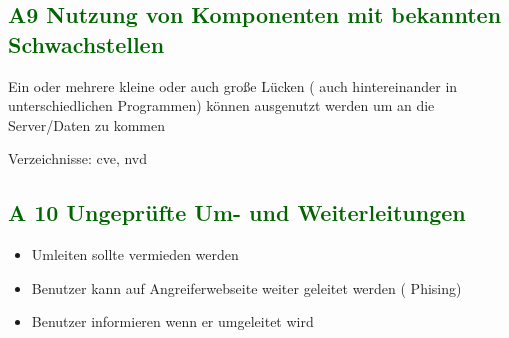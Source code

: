 \subsection*{\textcolor{darkgreen}{A9 Nutzung von Komponenten mit bekannten Schwachstellen}}

 Ein oder mehrere kleine oder auch große Lücken ( auch hintereinander in unterschiedlichen Programmen) können ausgenutzt werden um an die Server/Daten zu kommen
 
 Verzeichnisse: cve, nvd
 
\subsection*{\textcolor{darkgreen}{A 10 Ungeprüfte Um- und Weiterleitungen}}

\begin{itemize}
	\item Umleiten sollte vermieden werden
	\item Benutzer kann auf Angreiferwebseite weiter geleitet werden ( Phising)
	\item Benutzer informieren wenn er umgeleitet wird
\end{itemize}
